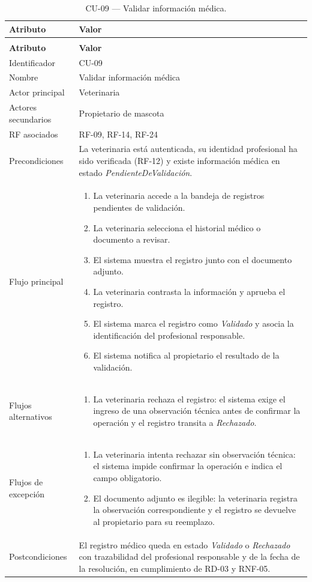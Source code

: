 \documentclass[journal,onecolumn]{IEEEtran}
\makeatletter
\newenvironment{atributos}[2]{%
	\small
	\begin{longtable}{@{}>{\raggedright\arraybackslash}p{4.2cm} >{\raggedright\arraybackslash}p{11.2cm}@{}}
		\caption{#2}\label{tab:#1}\\
		\toprule
		\textbf{Atributo} & \textbf{Valor} \\
		\midrule
		\endfirsthead
		\multicolumn{2}{@{}l}{\small\itshape (continuación)}\\
		\toprule
		\textbf{Atributo} & \textbf{Valor} \\
		\midrule
		\endhead
		\bottomrule
		\endlastfoot
	}{%
	\end{longtable}
	\normalsize
}
\makeatother
\begin{document}
	\begin{atributos}{CU-09}{CU-09 --- Validar información médica.}
		Identificador & CU-09 \\
		Nombre & Validar información médica \\
		Actor principal & Veterinaria \\
		Actores secundarios & Propietario de mascota \\
		RF asociados & RF-09, RF-14, RF-24 \\
		Precondiciones & La veterinaria está autenticada, su identidad profesional ha sido verificada (RF-12) y existe información médica en estado \emph{PendienteDeValidación}. \\
		Flujo principal &
		\begin{enumerate}[leftmargin=*, nosep]
			\item La veterinaria accede a la bandeja de registros pendientes de validación.
			\item La veterinaria selecciona el historial médico o documento a revisar.
			\item El sistema muestra el registro junto con el documento adjunto.
			\item La veterinaria contrasta la información y aprueba el registro.
			\item El sistema marca el registro como \emph{Validado} y asocia la identificación del profesional responsable.
			\item El sistema notifica al propietario el resultado de la validación.
		\end{enumerate} \\
		Flujos alternativos &
		\begin{enumerate}[leftmargin=*, nosep]
			\item[4.1] La veterinaria rechaza el registro: el sistema exige el ingreso de una observación técnica antes de confirmar la operación y el registro transita a \emph{Rechazado}.
		\end{enumerate} \\
		Flujos de excepción &
		\begin{enumerate}[leftmargin=*, nosep]
			\item[4.2] La veterinaria intenta rechazar sin observación técnica: el sistema impide confirmar la operación e indica el campo obligatorio.
			\item[3.1] El documento adjunto es ilegible: la veterinaria registra la observación correspondiente y el registro se devuelve al propietario para su reemplazo.
		\end{enumerate} \\
		Postcondiciones & El registro médico queda en estado \emph{Validado} o \emph{Rechazado} con trazabilidad del profesional responsable y de la fecha de la resolución, en cumplimiento de RD-03 y RNF-05. \\
	\end{atributos}
	
\end{document}
